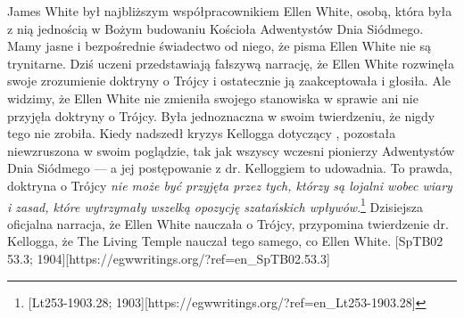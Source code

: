 James White był najbliższym współpracownikiem Ellen White, osobą, która była z nią jednością w Bożym budowaniu Kościoła Adwentystów Dnia Siódmego. Mamy jasne i bezpośrednie świadectwo od niego, że pisma Ellen White nie są trynitarne. Dziś uczeni przedstawiają fałszywą narrację, że Ellen White rozwinęła swoje zrozumienie doktryny o Trójcy i ostatecznie ją zaakceptowała i głosiła. Ale widzimy, że Ellen White nie zmieniła swojego stanowiska w sprawie  ani nie przyjęła doktryny o Trójcy. Była jednoznaczna w swoim twierdzeniu, że nigdy tego nie zrobiła. Kiedy nadszedł kryzys Kellogga dotyczący , pozostała niewzruszona w swoim poglądzie, tak jak wszyscy wczesni pionierzy Adwentystów Dnia Siódmego — a jej postępowanie z dr. Kelloggiem to udowadnia. To prawda, doktryna o Trójcy \textit{nie może być przyjęta przez tych, którzy są lojalni wobec wiary i zasad, które wytrzymały wszelką opozycję szatańskich wpływów}.\footnote{[Lt253-1903.28; 1903][https://egwwritings.org/?ref=en\_Lt253-1903.28]} Dzisiejsza oficjalna narracja, że Ellen White nauczała o Trójcy, przypomina twierdzenie dr. Kellogga, że The Living Temple nauczał tego samego, co Ellen White. [SpTB02 53.3; 1904][https://egwwritings.org/?ref=en\_SpTB02.53.3]
